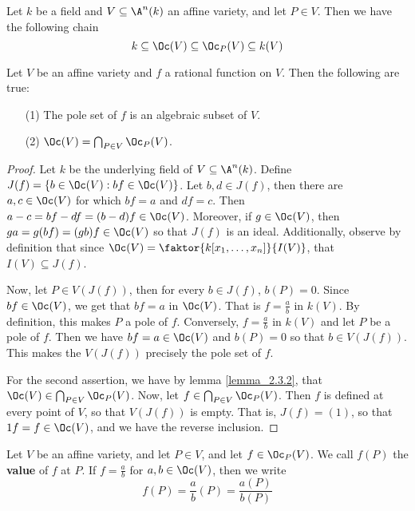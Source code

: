 \begin{lemma}\label{lemma_2.3.2}
  Let $k$ be a field and  $V \subseteq \A^n(k)$ an affine variety, and
  let $P \in V$. Then we have the following chain
  \begin{equation*}
    k \subseteq \Oc(V) \subseteq \Oc_P(V) \subseteq k(V)
  \end{equation*}
\end{lemma}

\begin{proposition}\label{proposition_2.3.3}
  Let $V$ be an affine variety and  $f$ a rational function on  $V$.
  Then the following are true:
  \begin{enumerate}
    \item[(1)] The pole set of $f$ is an algebraic subset of $V$.

    \item[(2)] $\Oc(V)=\bigcap_{P \in V}{\Oc_P(V)}$.
  \end{enumerate}
\end{proposition}
\begin{proof}
  Let $k$ be the underlying field of  $V \subseteq \A^n(k)$. Define
  $J(f)=\{ b \in \Oc(V) : bf \in \Oc(V) \}$. Let $b,d \in J(f)$,
  then there are $a,c \in \Oc(V)$ for which $bf=a$ and $df=c$.
  Then $a-c=bf-df=(b-d)f \in \Oc(V)$. Moreover, if $g \in \Oc(V)$,
  then $ga=g(bf)=(gb)f \in \Oc(V)$ so that $J(f)$ is an ideal.
  Additionally, observe by definition that since
  $\Oc(V)=\faktor{k[x_1, \dots, x_n]}{I(V)}$, that $I(V) \subseteq
  J(f)$.

  Now, let $P \in V(J(f))$, then for every $b \in J(f)$, $b(P)=0$.
  Since $bf \in \Oc(V)$, we get that $bf=a$ in $\Oc(V)$. That is
  $f=\frac{a}{b}$ in $k(V)$. By definition, this makes $P$ a pole of
  $f$. Conversely, $f=\frac{a}{b}$ in $k(V)$ and let $P$ be a pole of
   $f$. Then we have $bf=a \in \Oc(V)$ and $b(P)=0$ so that $b \in
   V(J(f))$. This makes the $V(J(f))$ precisely the pole set of $f$.

   For the second assertion, we have by lemma \ref{lemma_2.3.2}, that
   $\Oc(V) \in \bigcap_{P \in V}{\Oc_P(V)}$. Now, let $f \in
   \bigcap_{P \in V}{\Oc_P(V)}$. Then $f$ is defined at every point of
   $V$, so that  $V(J(f))$ is empty. That is, $J(f)=(1)$, so that
   $1f=f \in \Oc(V)$, and we have the reverse inclusion.
\end{proof}

\begin{definition}
  Let $V$ be an affine variety, and let $P \in V$, and let $f \in
  \Oc_P(V)$. We call $f(P)$ the \textbf{value} of $f$ at $P$. If
  $f=\frac{a}{b}$ for $a,b \in \Oc(V)$, then we write
  \begin{equation*}
    f(P)=\frac{a}{b}(P)=\frac{a(P)}{b(P)}
  \end{equation*}
\end{definition}

